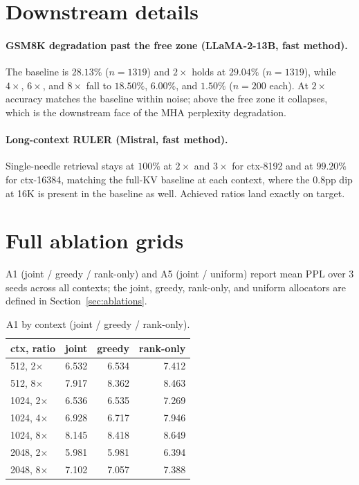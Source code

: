 \documentclass{article}
\begin{document}
\section{Downstream details}
\label{app:downstream}
\paragraph{GSM8K degradation past the free zone (LLaMA-2-13B, fast method).} The baseline is $28.13\%$ ($n{=}1319$) and $2\times$ holds at $29.04\%$ ($n{=}1319$), while $4\times$, $6\times$, and $8\times$ fall to $18.50\%$, $6.00\%$, and $1.50\%$ ($n{=}200$ each). At $2\times$ accuracy matches the baseline within noise; above the free zone it collapses, which is the downstream face of the MHA perplexity degradation.

\paragraph{Long-context RULER (Mistral, fast method).} Single-needle retrieval stays at $100\%$ at $2\times$ and $3\times$ for ctx-8192 and at $99.20\%$ for ctx-16384, matching the full-KV baseline at each context, where the $0.8$pp dip at 16K is present in the baseline as well. Achieved ratios land exactly on target.

\section{Full ablation grids}
\label{app:ablations}
A1 (joint / greedy / rank-only) and A5 (joint / uniform) report mean PPL over 3 seeds across all contexts; the joint, greedy, rank-only, and uniform allocators are defined in Section~\ref{sec:ablations}.

\begin{table}[htbp]
  \centering
  \caption{A1 by context (joint / greedy / rank-only).}
  \begin{tabular}{lrrr}
    \toprule
    ctx, ratio & joint & greedy & rank-only \\
    \midrule
    512, 2$\times$  & 6.532 & 6.534 & 7.412 \\
    512, 8$\times$  & 7.917 & 8.362 & 8.463 \\
    1024, 2$\times$ & 6.536 & 6.535 & 7.269 \\
    1024, 4$\times$ & 6.928 & 6.717 & 7.946 \\
    1024, 8$\times$ & 8.145 & 8.418 & 8.649 \\
    2048, 2$\times$ & 5.981 & 5.981 & 6.394 \\
    2048, 8$\times$ & 7.102 & 7.057 & 7.388 \\
    \bottomrule
  \end{tabular}
\end{table}
\end{document}
